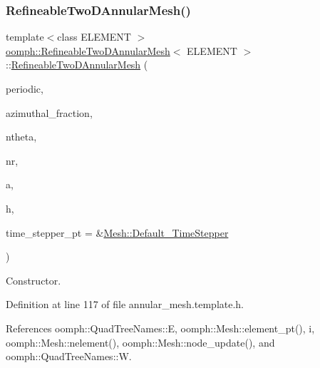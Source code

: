 \subsubsection{\texorpdfstring{Refineable\+Two\+D\+Annular\+Mesh()}{RefineableTwoDAnnularMesh()}\hspace{0.1cm}{\footnotesize\ttfamily [1/2]}}
{\footnotesize\ttfamily template$<$class E\+L\+E\+M\+E\+NT $>$ \\
\hyperlink{classoomph_1_1RefineableTwoDAnnularMesh}{oomph\+::\+Refineable\+Two\+D\+Annular\+Mesh}$<$ E\+L\+E\+M\+E\+NT $>$\+::\hyperlink{classoomph_1_1RefineableTwoDAnnularMesh}{Refineable\+Two\+D\+Annular\+Mesh} (\begin{DoxyParamCaption}\item[{const bool \&}]{periodic,  }\item[{const double \&}]{azimuthal\+\_\+fraction,  }\item[{const unsigned \&}]{ntheta,  }\item[{const unsigned \&}]{nr,  }\item[{const double \&}]{a,  }\item[{const double \&}]{h,  }\item[{\hyperlink{classoomph_1_1TimeStepper}{Time\+Stepper} $\ast$}]{time\+\_\+stepper\+\_\+pt = {\ttfamily \&\hyperlink{classoomph_1_1Mesh_a12243d0fee2b1fcee729ee5a4777ea10}{Mesh\+::\+Default\+\_\+\+Time\+Stepper}} }\end{DoxyParamCaption})\hspace{0.3cm}{\ttfamily [inline]}}



Constructor. 



Definition at line 117 of file annular\+\_\+mesh.\+template.\+h.



References oomph\+::\+Quad\+Tree\+Names\+::E, oomph\+::\+Mesh\+::element\+\_\+pt(), i, oomph\+::\+Mesh\+::nelement(), oomph\+::\+Mesh\+::node\+\_\+update(), and oomph\+::\+Quad\+Tree\+Names\+::W.

\mbox{\label{classoomph_1_1RefineableTwoDAnnularMesh_a5efdb906168255f7264ee22a963d7eb6}} 
